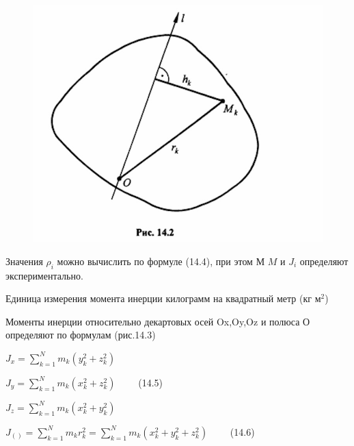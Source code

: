 {\begin{center}
\begin{figure}[H]
        \centering\includegraphics[scale=0.25]{img/14.2.jpeg} 
        \end{figure}
    \par Значения $\rho_i$ можно вычислить по формуле (14.4), при этом М $M$ и $J_i$ определяют экспериментально. 
    \par Единица измерения момента инерции килограмм на квадратный метр (кг $м^2$)
    \par Моменты инерции относительно декартовых осей Ox,Oy,Oz и полюса О определяют по формулам (рис.14.3)
    \par ${J_x} = {\sum_{k=1}^N {m_k (y_k^2 + z_k^2)}}$
    \par ${J_y} = {\sum_{k=1}^N {m_k (x_k^2 + z_k^2)}} \qquad$ (14.5)
    \par ${J_z} = {\sum_{k=1}^N {m_k (x_k^2 + y_k^2)}}$    
    \par ${J_{()}} = {\sum_{k=1}^N {m_k r_k^2}} = {\sum_{k=1}^N {m_k (x_k^2 + y_k^2 + z_k^2)}} \qquad$  (14.6)
    

\end{center}}
